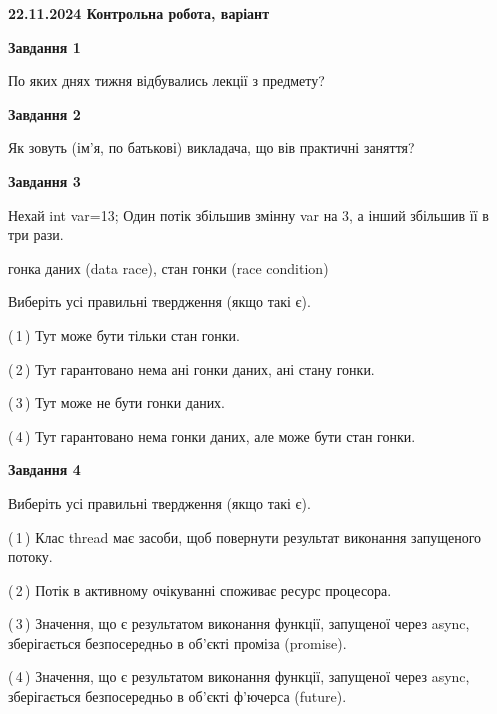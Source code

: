 \documentclass[12pt, ukrainian]{article}
\begin{document}
\begin {large}

\textbf{22.11.2024 Контрольна робота, варіант  }\par


{

\begin{center}
\textbf{Завдання 1}
\end{center}

По яких днях тижня відбувались лекції з предмету?


\begin{center}
\textbf{Завдання 2}
\end{center}

Як зовуть (ім'я, по батькові) викладача, що вів практичні заняття?


\begin{center}
\textbf{Завдання 3}
\end{center}

Нехай int var=13; Один потік збільшив змінну var на 3, а інший збільшив її в три рази.

гонка даних (data race), стан гонки (race condition)

Виберіть усі правильні твердження (якщо такі є).\par
\vspace{2mm}
(\,1\,) Тут може бути тільки стан гонки.%

(\,2\,) Тут гарантовано нема ані гонки даних, ані стану гонки.%

(\,3\,) Тут може не бути гонки даних.%

(\,4\,) Тут гарантовано нема гонки даних, але може бути стан гонки.%


\begin{center}
\textbf{Завдання 4}
\end{center}

Виберіть усі правильні твердження (якщо такі є).\par
\vspace{2mm}

(\,1\,) Клас thread має засоби, щоб повернути результат виконання запущеного потоку.%

(\,2\,) Потік в активному очікуванні споживає ресурс процесора.%

(\,3\,) Значення, що є результатом виконання функції, запущеної через async, зберігається безпосередньо в об’єкті проміза (promise).%

(\,4\,) Значення, що є результатом виконання функції, запущеної через async, зберігається безпосередньо в об’єкті ф’ючерса (future).%


}
\end{large}
\end{document}
